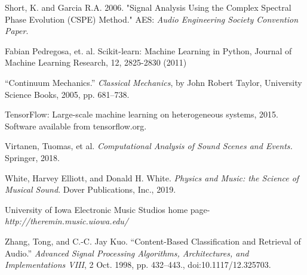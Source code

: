 \documentclass[12pt,letterpaper]{article}
\begin{document}
\begin{thebibliography}{9}
Short, K. and Garcia R.A. 2006. "Signal Analysis Using the Complex Spectral Phase Evolution (CSPE) Method." AES: \textit{Audio Engineering Society Convention Paper}.

Fabian Pedregosa, et. al. Scikit-learn: Machine Learning in Python, Journal of Machine Learning Research, 12, 2825-2830 (2011) 

“Continuum Mechanics.” \textit{Classical Mechanics}, by John Robert Taylor, University Science Books, 2005, pp. 681–738. 

TensorFlow: Large-scale machine learning on heterogeneous systems,
2015. Software available from tensorflow.org.

Virtanen, Tuomas, et al. \textit{Computational Analysis of Sound Scenes and Events.} Springer, 2018.

White, Harvey Elliott, and Donald H. White. \textit{Physics and Music: the Science of Musical Sound}. Dover Publications, Inc., 2019.

University of Iowa Electronic Music Studios home page- \textit{http://theremin.music.uiowa.edu/}

Zhang, Tong, and C.-C. Jay Kuo. “Content-Based Classification and Retrieval of Audio.” \textit{Advanced Signal Processing Algorithms, Architectures, and Implementations VIII}, 2 Oct. 1998, pp. 432–443., doi:10.1117/12.325703.

\end{thebibliography}

\end{document}
